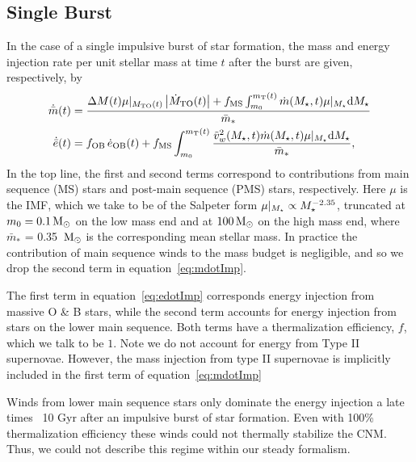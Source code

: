 
\subsection{Single Burst}

In the case of a single impulsive burst of star formation, the mass
and energy injection rate per unit stellar mass at time $t$ after the
burst are given, respectively, by
\begin{align} 
  \dot{\bar{m}}(t) &= \frac{\Delta M(t) \mu|_{M_{\rm TO}(t)}
    \left|\dot{M}_{\rm TO}(t)\right| + f_{\rm MS} \int_{m_0}^{m_{\rm
        T}(t)} \dot{m}(M_{\star}, t) \mu|_{M_{\star}} {\rm d}M_{\star}
  }{\bar{m}_*}\label{eq:mdotImp}
  \\
  \dot{\bar{e}}(t) &=f_{\rm OB} \, \dot{e}_{\rm OB}(t)+ f_{\rm MS}
  \int_{m_0}^{m_{\rm T}(t)} \frac{\tilde{v}_{w}^2(M_{\star}, t) \dot{m}(M_{\star}, t)
    \mu|_{M_{\star}} {\rm d}M_{\star}}{\bar{m}_*},
  \label{eq:edotImp}
\end{align} 
In the top line, the first and second terms correspond to contributions
from main sequence (MS) stars and post-main sequence (PMS) stars,
respectively. Here $\mu$ is the IMF, which we take to be of the
Salpeter form $\mu|_{M_{\star}} \propto M_{\star}^{-2.35}$, truncated at
$m_0 = 0.1 \,{\rm M_\odot}$ on the low mass end and at $100 \,{\rm M_\odot}$ on the high
mass end, where $\bar{m}_*$ = 0.35 $\,{\rm M_\odot}$ is the corresponding mean
stellar mass. In practice the contribution of main sequence winds to
the mass budget is negligible, and so we drop the second term in
equation~\eqref{eq:mdotImp}.

The first term in equation~\eqref{eq:edotImp} corresponds energy
injection from massive O \& B stars, while the second term accounts
for energy injection from stars on the lower main sequence. Both terms
have a thermalization efficiency, $f$, which we talk to be $1$. Note
we do not account for energy from Type II supernovae. However, the
mass injection from type II supernovae is implicitly included in the
first term of equation~\eqref{eq:mdotImp}

Winds from lower main sequence stars only dominate the energy
injection a late times ~10 Gyr after an impulsive burst of star
formation. Even with 100\% thermalization efficiency these winds could
not thermally stabilize the CNM. Thus, we could not describe this
regime within our steady formalism.

